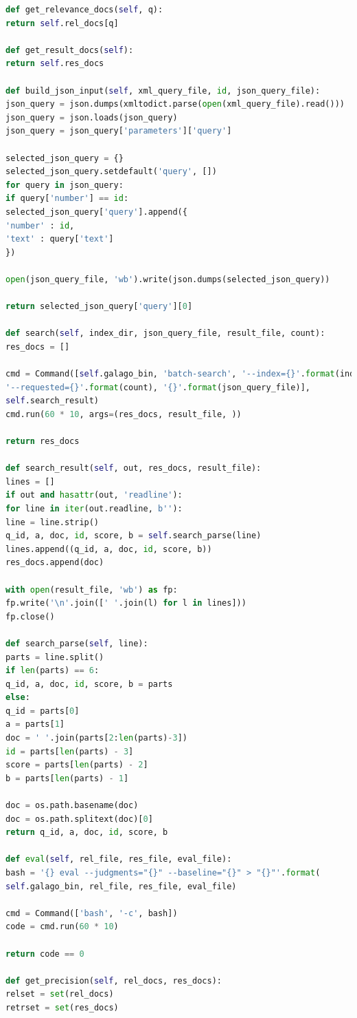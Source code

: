 \documentclass[letterpaper,11pt]{article}
\begin{document}
\begin{lstlisting}[language=python, caption={Code for galago.py}, label={lst:galago.py}]
def get_relevance_docs(self, q):
return self.rel_docs[q]

def get_result_docs(self):
return self.res_docs

def build_json_input(self, xml_query_file, id, json_query_file):
json_query = json.dumps(xmltodict.parse(open(xml_query_file).read()))
json_query = json.loads(json_query)
json_query = json_query['parameters']['query']

selected_json_query = {}
selected_json_query.setdefault('query', [])
for query in json_query:
if query['number'] == id:
selected_json_query['query'].append({
'number' : id,
'text' : query['text']
})

open(json_query_file, 'wb').write(json.dumps(selected_json_query))

return selected_json_query['query'][0]

def search(self, index_dir, json_query_file, result_file, count):
res_docs = []

cmd = Command([self.galago_bin, 'batch-search', '--index={}'.format(index_dir),
'--requested={}'.format(count), '{}'.format(json_query_file)],
self.search_result)
cmd.run(60 * 10, args=(res_docs, result_file, ))

return res_docs

def search_result(self, out, res_docs, result_file):
lines = []
if out and hasattr(out, 'readline'):
for line in iter(out.readline, b''):
line = line.strip()
q_id, a, doc, id, score, b = self.search_parse(line)
lines.append((q_id, a, doc, id, score, b))
res_docs.append(doc)

with open(result_file, 'wb') as fp:
fp.write('\n'.join([' '.join(l) for l in lines]))
fp.close()

def search_parse(self, line):
parts = line.split()
if len(parts) == 6:
q_id, a, doc, id, score, b = parts
else:
q_id = parts[0]
a = parts[1]
doc = ' '.join(parts[2:len(parts)-3])
id = parts[len(parts) - 3]
score = parts[len(parts) - 2]
b = parts[len(parts) - 1]

doc = os.path.basename(doc)
doc = os.path.splitext(doc)[0]
return q_id, a, doc, id, score, b

def eval(self, rel_file, res_file, eval_file):
bash = '{} eval --judgments="{}" --baseline="{}" > "{}"'.format(
self.galago_bin, rel_file, res_file, eval_file)

cmd = Command(['bash', '-c', bash])
code = cmd.run(60 * 10)

return code == 0

def get_precision(self, rel_docs, res_docs):
relset = set(rel_docs)
retrset = set(res_docs)


\end{lstlisting}
\end{document}
